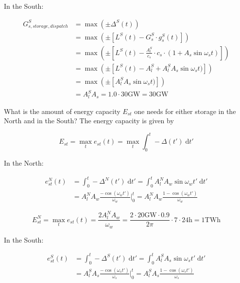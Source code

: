 \documentclass[11pt,a4paper,fleqn]{scrartcl}
\begin{document}
\begin{enumerate}[(a)]
 In the South:

 \begin{align*}
  G_{s,storage,dispatch}^S & = \max ( \pm \Delta^S(t))                                                              \\
                           & = \max (\pm [L^S(t) - G^S_s \cdot g^S_s(t)])                             \\
                           & = \max (\pm [L^S(t) - \frac{A^S_l}{c_s}\cdot c_s\cdot (1+A_s \sin \omega_s t)]) \\
                           & = \max (\pm [L^S(t) - A^S_l + A^S_l A_s \sin \omega_s t)])                      \\
                           & = \max (\pm [A^S_l A_s \sin \omega_s t)])                                         \\
                           & = A^S_l A_s = 1.0 \cdot 30 \si{\giga\watt} = 30 \si{\giga\watt}
 \end{align*}

 \begin{shaded}\item What is the amount of energy capacity $E_{st}$ one needs for either storage in the North and in the South? The energy capacity is given by
 	
 	\begin{equation*}
 	E_{st} = \max_t e_{st}(t) = \max_t \int_{0}^{t} -\Delta(t') \;\mathrm{d}t'
 	\end{equation*}

 \end{shaded}

 In the North:

 \begin{align*}
  e_{st}^N(t) & = \int_{0}^{t} -\Delta^N(t') \;\mathrm{d}t' = \int_{0}^{t} A^N_l A_w \sin \omega_w t' \;\mathrm{d}t'           \\
           & = A^N_l A_w \frac{-\cos(\omega_w t')}{\omega_w}\Big|_0^t = A^N_l A_w \frac{1-\cos(\omega_w t')}{\omega_w}
 \end{align*}

 \begin{equation*}
  E_{st}^N = \max_t e_{st}(t) = \frac{2A^N_lA_w}{\omega_w} = \frac{2\cdot 20 \si{\giga\watt}\cdot 0.9}{2\pi} \cdot 7\cdot 24 \si{\hour} = 1 \si{\tera\watt\hour}
 \end{equation*}

 In the South:

 \begin{align*}
  e_{st}^S(t) & = \int_{0}^{t} -\Delta^S(t') \;\mathrm{d}t' = \int_{0}^{t} A^S_l A_s \sin \omega_s t' \;\mathrm{d}t'           \\
           & = A^S_l A_s \frac{-\cos(\omega_s t')}{\omega_s}\Big|_0^t = A^S_l A_s \frac{1-\cos(\omega_s t')}{\omega_s}
 \end{align*}


\end{enumerate}
\end{document}
